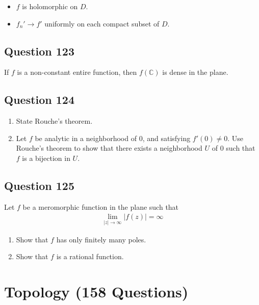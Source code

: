 \documentclass[12pt]{article}
\begin{document}
\begin{itemize}
\item
  \(f\) is holomorphic on \(D\).
\item
  \(f_n' \to f'\) uniformly on each compact subset of \(D\).
\end{itemize}

\hypertarget{question-123-1}{%
\subsection{Question 123}\label{question-123-1}}

If \(f\) is a non-constant entire function, then \(f(\mathbb{C})\) is
dense in the plane.

\hypertarget{question-124-1}{%
\subsection{Question 124}\label{question-124-1}}

\begin{enumerate}
\def\labelenumi{\arabic{enumi}.}
\item
  State Rouche's theorem.
\item
  Let \(f\) be analytic in a neighborhood of \(0\), and satisfying
  \(f'(0) \neq 0\). Use Rouche's theorem to show that there exists a
  neighborhood \(U\) of \(0\) such that \(f\) is a bijection in \(U\).
\end{enumerate}

\hypertarget{question-125-1}{%
\subsection{Question 125}\label{question-125-1}}

Let \(f\) be a meromorphic function in the plane such that
\begin{align*}
\lim_{|z|\to\infty} |f(z)| = \infty
\end{align*}

\begin{enumerate}
\def\labelenumi{\arabic{enumi}.}
\item
  Show that \(f\) has only finitely many poles.
\item
  Show that \(f\) is a rational function.
\end{enumerate}

\hypertarget{topology-158-questions}{%
\section{Topology (158 Questions)}\label{topology-158-questions}}
\end{document}
